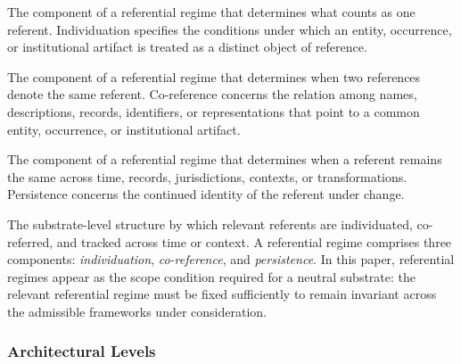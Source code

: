 \begin{description}[style=nextline,leftmargin=1.5cm]

\item[Individuation]
The component of a referential regime that determines
what counts as one referent.
Individuation specifies the conditions under which
an entity, occurrence, or institutional artifact is treated
as a distinct object of reference.

\item[Co-reference]
The component of a referential regime that determines
when two references denote the same referent.
Co-reference concerns the relation among names, descriptions,
records, identifiers, or representations that point to
a common entity, occurrence, or institutional artifact.

\item[Persistence]
The component of a referential regime that determines
when a referent remains the same across time, records,
jurisdictions, contexts, or transformations.
Persistence concerns the continued identity of the referent
under change.

\item[Referential Regime]
The substrate-level structure by which relevant referents
are individuated, co-referred, and tracked across time or context.
A referential regime comprises three components:
\emph{individuation}, \emph{co-reference}, and \emph{persistence}.
In this paper, referential regimes appear as the scope condition
required for a neutral substrate:
the relevant referential regime must be fixed sufficiently
to remain invariant
across the admissible frameworks under consideration.

\end{description}

\subsubsection*{Architectural Levels}

